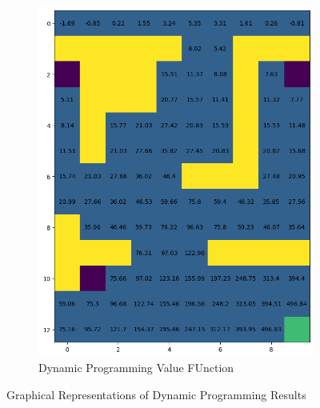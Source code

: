 \documentclass[12pt,a4paper]{report}
\begin{document}
\begin{figure}[H]
\begin{subfigure}[b]{0.49\textwidth}
        \includegraphics[width=\textwidth]{assets/dp/dp_value_function.png}        
        \caption{Dynamic Programming Value FUnction}
    \end{subfigure}
    \caption*{Graphical Representations of Dynamic Programming Results}
\end{figure} 

\break
\end{document}
